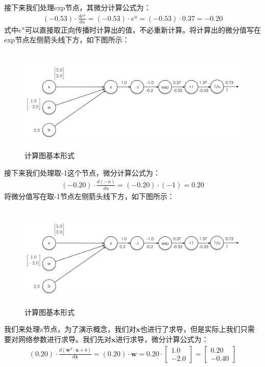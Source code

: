 \documentclass[UTF8]{article}
\begin{document}
接下来我们处理exp节点，其微分计算公式为：
\begin{equation}
\begin{aligned}
(-0.53) \cdot \frac{de^u}{du}=(-0.53) \cdot e^u=(-0.53) \cdot 0.37=-0.20
\end{aligned}
\label{mlp-sigmoid-cg-7}
\end{equation}
式中$e^u$可以直接取正向传播时计算出的值，不必重新计算。将计算出的微分值写在exp节点左侧箭头线下方，如下图所示：
\begin{figure}[H]
	\caption{计算图基本形式}
	\label{f000045}
	\centering
	\includegraphics[height=5cm]{images/f000045}
\end{figure}
接下来我们处理取-1这个节点，微分计算公式为：
\begin{equation}
\begin{aligned}
(-0.20) \cdot \frac{d(-u)}{du}=(-0.20) \cdot (-1)=0.20
\end{aligned}
\label{mlp-sigmoid-cg-8}
\end{equation}
将微分值写在取-1节点左侧箭头线下方，如下图所示：
\begin{figure}[H]
	\caption{计算图基本形式}
	\label{f000046}
	\centering
	\includegraphics[height=5cm]{images/f000046}
\end{figure}
我们来处理z节点，为了演示概念，我们对$\boldsymbol{x}$也进行了求导，但是实际上我们只需要对网络参数进行求导。我们先对$\boldsymbol{x}$进行求导，微分计算公式为：
\begin{equation}
\begin{aligned}
(0.20) \cdot \frac{d(\boldsymbol{w}^T \cdot \boldsymbol{x}+b)}{d\boldsymbol{x}}=(0.20) \cdot \boldsymbol{w}=0.20 \cdot \begin{bmatrix}
1.0 \\
-2.0
\end{bmatrix}=\begin{bmatrix}
0.20 \\
-0.40
\end{bmatrix}
\end{aligned}
\label{mlp-sigmoid-cg-9}
\end{equation}
\end{document}
